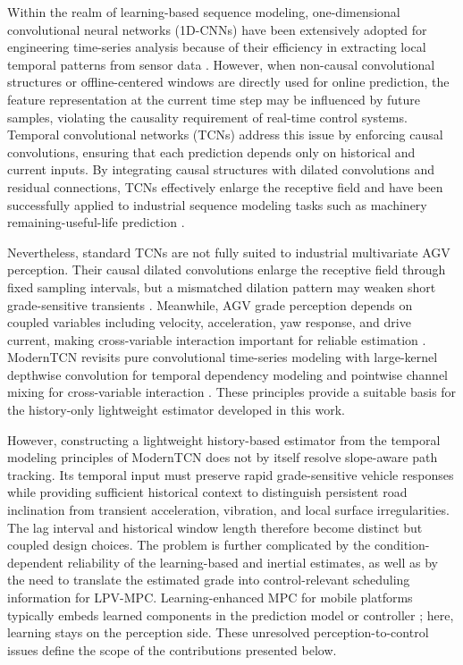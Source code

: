 \documentclass{ieeeaccess}
\newcommand{\citep}[1]{\cite{#1}}
\begin{document}
Within the realm of learning-based sequence modeling, one-dimensional convolutional neural networks (1D-CNNs) have been extensively adopted for engineering time-series analysis because of their efficiency in extracting local temporal patterns from sensor data \citep{Bueno2023Inception1DCNN}. However, when non-causal convolutional structures or offline-centered windows are directly used for online prediction, the feature representation at the current time step may be influenced by future samples, violating the causality requirement of real-time control systems. Temporal convolutional networks (TCNs) address this issue by enforcing causal convolutions, ensuring that each prediction depends only on historical and current inputs. By integrating causal structures with dilated convolutions and residual connections, TCNs effectively enlarge the receptive field and have been successfully applied to industrial sequence modeling tasks such as machinery remaining-useful-life prediction \citep{Bai2018TCN,Cao2021TCNRSA}.

Nevertheless, standard TCNs are not fully suited to industrial multivariate AGV perception. Their causal dilated convolutions enlarge the receptive field through fixed sampling intervals, but a mismatched dilation pattern may weaken short grade-sensitive transients \citep{Cao2021TCNRSA}. Meanwhile, AGV grade perception depends on coupled variables including velocity, acceleration, yaw response, and drive current, making cross-variable interaction important for reliable estimation \citep{Jin2023MTGODE}. ModernTCN revisits pure convolutional time-series modeling with large-kernel depthwise convolution for temporal dependency modeling and pointwise channel mixing for cross-variable interaction \citep{Luo2024ModernTCN}. These principles provide a suitable basis for the history-only lightweight estimator developed in this work.

However, constructing a lightweight history-based estimator from the temporal modeling principles of ModernTCN does not by itself resolve slope-aware path tracking. Its temporal input must preserve rapid grade-sensitive vehicle responses while providing sufficient historical context to distinguish persistent road inclination from transient acceleration, vibration, and local surface irregularities. The lag interval and historical window length therefore become distinct but coupled design choices. The problem is further complicated by the condition-dependent reliability of the learning-based and inertial estimates, as well as by the need to translate the estimated grade into control-relevant scheduling information for LPV-MPC. Learning-enhanced MPC for mobile platforms typically embeds learned components in the prediction model or controller \citep{Zhang2022LBMPCSurvey,Li2024PINNAGV}; here, learning stays on the perception side. These unresolved perception-to-control issues define the scope of the contributions presented below.
\end{document}
